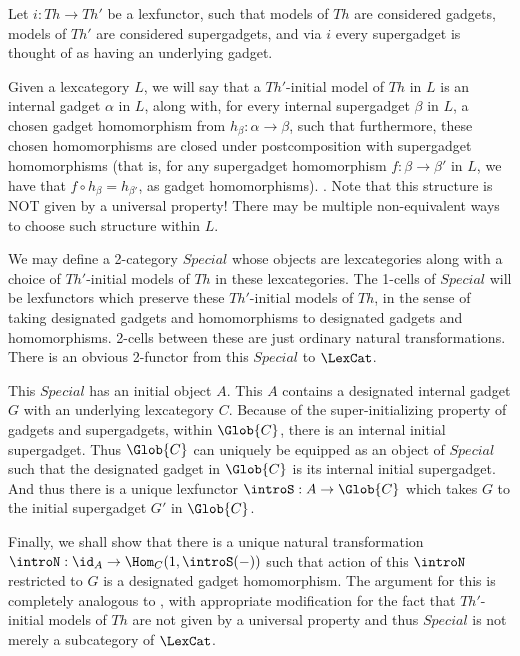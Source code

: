\begin{construction}
Let $i : Th \to Th'$ be a lexfunctor, such that models of $Th$ are considered gadgets, models of $Th'$ are considered supergadgets, and via $i$ every supergadget is thought of as having an underlying gadget.

Given a lexcategory $L$, we will say that a $Th'$-initial model of $Th$ in $L$ is an internal gadget $\alpha$ in $L$, along with, for every internal supergadget $\beta$ in $L$, a chosen gadget homomorphism from $h_\beta : \alpha \to \beta$, such that furthermore, these chosen homomorphisms are closed under postcomposition with supergadget homomorphisms (that is, for any supergadget homomorphism $f : \beta \to \beta'$ in $L$, we have that $f \circ h_{\beta} = h_{\beta'}$, as gadget homomorphisms). . Note that this structure is NOT given by a universal property! There may be multiple non-equivalent ways to choose such structure within $L$.

We may define a 2-category $Special$ whose objects are lexcategories along with a choice of $Th'$-initial models of $Th$ in these lexcategories. The 1-cells of $Special$ will be lexfunctors which preserve these $Th'$-initial models of $Th$, in the sense of taking designated gadgets and homomorphisms to designated gadgets and homomorphisms. 2-cells between these are just ordinary natural transformations. There is an obvious 2-functor from this $Special$ to $\LexCat$.

This $Special$ has an initial object $A$. This $A$ contains a designated internal gadget $G$ with an underlying lexcategory $C$. Because of the super-initializing property of gadgets and supergadgets, within $\Glob{C}$, there is an internal initial supergadget. Thus $\Glob{C}$ can uniquely be equipped as an object of $Special$ such that the designated gadget in $\Glob{C}$ is its internal initial supergadget. And thus there is a unique lexfunctor $\introS : A \to \Glob{C}$ which takes $G$ to the initial supergadget $G'$ in $\Glob{C}$.

Finally, we shall show that there is a unique natural transformation $\introN : \id_A \to \Hom_C(1, \introS(-))$ such that action of this $\introN$ restricted to $G$ is a designated gadget homomorphism. The argument for this is completely analogous to , with appropriate modification for the fact that $Th'$-initial models of $Th$ are not given by a universal property and thus $Special$ is not merely a subcategory of $\LexCat$.


\end{construction}
